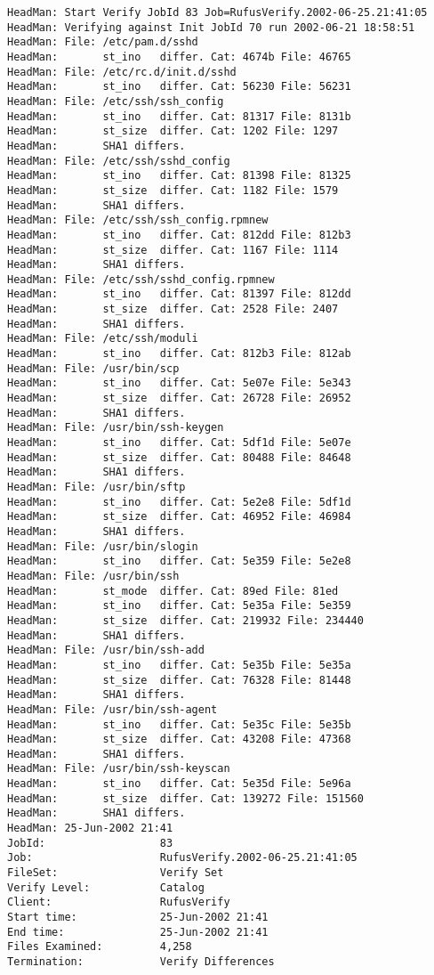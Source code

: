 \footnotesize
\begin{verbatim}
HeadMan: Start Verify JobId 83 Job=RufusVerify.2002-06-25.21:41:05
HeadMan: Verifying against Init JobId 70 run 2002-06-21 18:58:51
HeadMan: File: /etc/pam.d/sshd
HeadMan:       st_ino   differ. Cat: 4674b File: 46765
HeadMan: File: /etc/rc.d/init.d/sshd
HeadMan:       st_ino   differ. Cat: 56230 File: 56231
HeadMan: File: /etc/ssh/ssh_config
HeadMan:       st_ino   differ. Cat: 81317 File: 8131b
HeadMan:       st_size  differ. Cat: 1202 File: 1297
HeadMan:       SHA1 differs.
HeadMan: File: /etc/ssh/sshd_config
HeadMan:       st_ino   differ. Cat: 81398 File: 81325
HeadMan:       st_size  differ. Cat: 1182 File: 1579
HeadMan:       SHA1 differs.
HeadMan: File: /etc/ssh/ssh_config.rpmnew
HeadMan:       st_ino   differ. Cat: 812dd File: 812b3
HeadMan:       st_size  differ. Cat: 1167 File: 1114
HeadMan:       SHA1 differs.
HeadMan: File: /etc/ssh/sshd_config.rpmnew
HeadMan:       st_ino   differ. Cat: 81397 File: 812dd
HeadMan:       st_size  differ. Cat: 2528 File: 2407
HeadMan:       SHA1 differs.
HeadMan: File: /etc/ssh/moduli
HeadMan:       st_ino   differ. Cat: 812b3 File: 812ab
HeadMan: File: /usr/bin/scp
HeadMan:       st_ino   differ. Cat: 5e07e File: 5e343
HeadMan:       st_size  differ. Cat: 26728 File: 26952
HeadMan:       SHA1 differs.
HeadMan: File: /usr/bin/ssh-keygen
HeadMan:       st_ino   differ. Cat: 5df1d File: 5e07e
HeadMan:       st_size  differ. Cat: 80488 File: 84648
HeadMan:       SHA1 differs.
HeadMan: File: /usr/bin/sftp
HeadMan:       st_ino   differ. Cat: 5e2e8 File: 5df1d
HeadMan:       st_size  differ. Cat: 46952 File: 46984
HeadMan:       SHA1 differs.
HeadMan: File: /usr/bin/slogin
HeadMan:       st_ino   differ. Cat: 5e359 File: 5e2e8
HeadMan: File: /usr/bin/ssh
HeadMan:       st_mode  differ. Cat: 89ed File: 81ed
HeadMan:       st_ino   differ. Cat: 5e35a File: 5e359
HeadMan:       st_size  differ. Cat: 219932 File: 234440
HeadMan:       SHA1 differs.
HeadMan: File: /usr/bin/ssh-add
HeadMan:       st_ino   differ. Cat: 5e35b File: 5e35a
HeadMan:       st_size  differ. Cat: 76328 File: 81448
HeadMan:       SHA1 differs.
HeadMan: File: /usr/bin/ssh-agent
HeadMan:       st_ino   differ. Cat: 5e35c File: 5e35b
HeadMan:       st_size  differ. Cat: 43208 File: 47368
HeadMan:       SHA1 differs.
HeadMan: File: /usr/bin/ssh-keyscan
HeadMan:       st_ino   differ. Cat: 5e35d File: 5e96a
HeadMan:       st_size  differ. Cat: 139272 File: 151560
HeadMan:       SHA1 differs.
HeadMan: 25-Jun-2002 21:41
JobId:                  83
Job:                    RufusVerify.2002-06-25.21:41:05
FileSet:                Verify Set
Verify Level:           Catalog
Client:                 RufusVerify
Start time:             25-Jun-2002 21:41
End time:               25-Jun-2002 21:41
Files Examined:         4,258
Termination:            Verify Differences
\end{verbatim}
\normalsize

